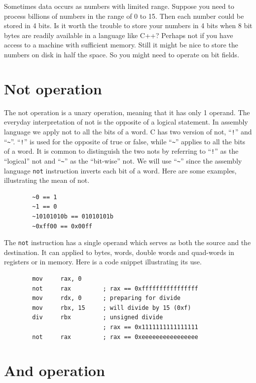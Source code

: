 \documentclass[11pt,b5paper]{book}
\begin{document}
Sometimes data occurs as numbers with limited range.
Suppose you need to process billions of numbers in the range of 0 to 15.
Then each number could be stored in 4 bits.
Is it worth the trouble to store your numbers in 4 bits when 8 bit bytes are
readily available in a language like C++?
Perhaps not if you have access to a machine with sufficient memory.
Still it might be nice to store the numbers on disk in half the space.
So you might need to operate on bit fields.

\section{Not operation}

The not operation is a unary operation, meaning that it has only 1 operand. 
The everyday interpretation of not is the opposite of a logical statement.
In assembly language we apply not to all the bits of a word.
C has two version of not, ``{\tt !}'' and ``{\tt \~{}}''.  ``{\tt !}'' is used for the opposite of
true or false, while ``{\tt \~{}}'' applies to all the bits of a word.
It is common to distinguish the two nots by referring to ``{\tt !}'' as the
``logical'' not and ``{\tt \~{}}'' as the ``bit-wise'' not.
We will use ``{\tt \~{}}'' since the assembly language {\tt not} instruction inverts
each bit of a word.  Here are some examples, illustrating the mean of not.

\begin{verbatim}
        ~0 == 1
        ~1 == 0
        ~10101010b == 01010101b
        ~0xff00 == 0x00ff
\end{verbatim}

The {\tt not} instruction has a single operand which serves as both the source
and the destination.
It can applied to bytes, words, double words and quad-words in registers or in
memory.
Here is a code snippet illustrating its use.
\begin{verbatim}
        mov     rax, 0
        not     rax         ; rax == 0xffffffffffffffff
        mov     rdx, 0      ; preparing for divide
        mov     rbx, 15     ; will divide by 15 (0xf)
        div     rbx         ; unsigned divide
                            ; rax == 0x1111111111111111
        not     rax         ; rax == 0xeeeeeeeeeeeeeeee
\end{verbatim}

\section{And operation}
\end{document}
